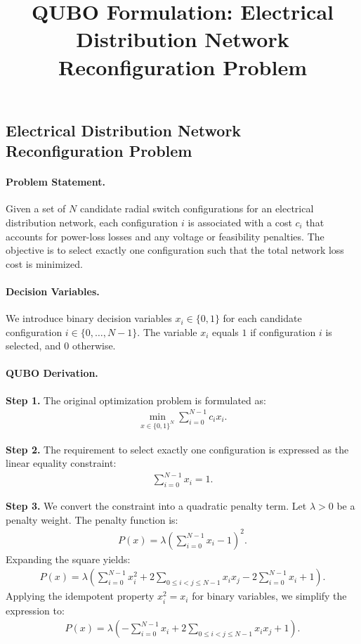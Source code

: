 \documentclass[12pt]{article}
\title{QUBO Formulation: Electrical Distribution Network Reconfiguration Problem}
\date{}
\begin{document}
\maketitle

\subsection*{Electrical Distribution Network Reconfiguration Problem}

\paragraph{Problem Statement.}
Given a set of $N$ candidate radial switch configurations for an electrical distribution network, each configuration $i$ is associated with a cost $c_i$ that accounts for power-loss losses and any voltage or feasibility penalties. The objective is to select exactly one configuration such that the total network loss cost is minimized.

\paragraph{Decision Variables.}
We introduce binary decision variables $x_i \in \{0,1\}$ for each candidate configuration $i \in \{0, \dots, N-1\}$. The variable $x_i$ equals $1$ if configuration $i$ is selected, and $0$ otherwise.

\paragraph{QUBO Derivation.}
\textbf{Step 1.} The original optimization problem is formulated as:
\begin{align}
\min_{x \in \{0,1\}^N} \sum_{i=0}^{N-1} c_i x_i.
\end{align}

\textbf{Step 2.} The requirement to select exactly one configuration is expressed as the linear equality constraint:
\begin{align}
\sum_{i=0}^{N-1} x_i = 1.
\end{align}

\textbf{Step 3.} We convert the constraint into a quadratic penalty term. Let $\lambda > 0$ be a penalty weight. The penalty function is:
\begin{align}
P(x) = \lambda \left( \sum_{i=0}^{N-1} x_i - 1 \right)^2.
\end{align}
Expanding the square yields:
\begin{align}
P(x) = \lambda \left( \sum_{i=0}^{N-1} x_i^2 + 2 \sum_{0 \le i < j \le N-1} x_i x_j - 2 \sum_{i=0}^{N-1} x_i + 1 \right).
\end{align}
Applying the idempotent property $x_i^2 = x_i$ for binary variables, we simplify the expression to:
\begin{align}
P(x) = \lambda \left( -\sum_{i=0}^{N-1} x_i + 2 \sum_{0 \le i < j \le N-1} x_i x_j + 1 \right).
\end{align}
\end{document}
